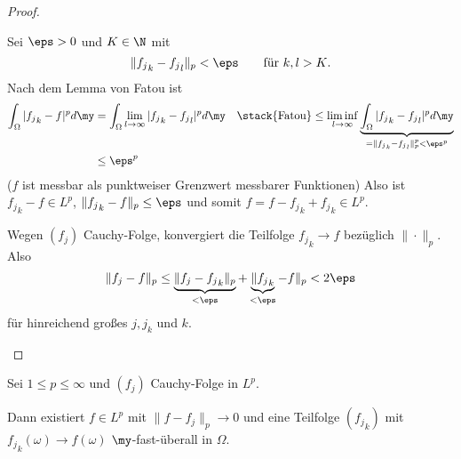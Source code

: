 \documentclass{mycourse}
\begin{document}
\begin{st}
\begin{proof}
\begin{seg}[$1 \le p < \infty$]
\begin{enumerate}[a)]
					Sei $\eps > 0$ und $K \in \N$ mit
					\[
						\|{f_j}_k - {f_j}_l \|_p < \eps  \qquad \text{für $k,l > K$.}
					\]
					Nach dem Lemma von Fatou ist
					\begin{align*}
						\int_{\Omega} |{f_j}_k - f|^p d\my
						&= \int_{\Omega} \lim_{l\to \infty} |{f_j}_k - {f_j}_l |^p d\my
						&\stack{\text{Fatou}}\le \liminf_{l\to \infty} \underbrace{\int_{\Omega} |{f_j}_k - {f_j}_l |^p d\my}_{= \|{f_j}_k - {f_j}_l\|_p^p < \eps^p} \\
						&\le \eps^p
					\end{align*}
					($f$ ist messbar als punktweiser Grenzwert messbarer Funktionen)
					Also ist ${f_j}_k - f \in L^p$, $\|{f_j}_k - f\|_p \le \eps$ und somit $f = f - {f_j}_k + {f_j}_k \in L^p$.

					Wegen $(f_j)$ Cauchy-Folge, konvergiert die Teilfolge ${f_j}_k \to f$ bezüglich $\|\cdot\|_p$.
					Also
					\[
						\|f_j - f\|_p 
						\le \underbrace{\|f_j - {f_j}_k \|_p}_{< \eps} + \underbrace{\|{f_j}_k}_{< \eps} - f\|_p 
						< 2 \eps
					\]
					für hinreichend großes $j, j_k$ und $k$.
			\end{enumerate}
		\end{seg}
	\end{proof}
\end{st}

\begin{kor}[Weyl] \label{2.14}
	Sei $1 \le p \le \infty$ und $(f_j)$ Cauchy-Folge in $L^p$.
	
	Dann existiert $f \in L^p$ mit $\|f - f_j\|_p \to 0$ und eine Teilfolge $({f_j}_k)$ mit ${f_j}_k(\omega) \to f(\omega)$ $\my$-fast-überall in $\Omega$.
\end{kor}
\end{document}
